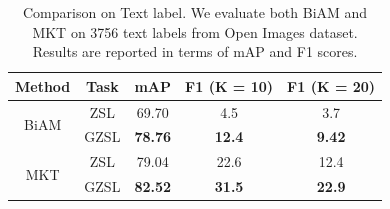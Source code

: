 \begin{table}[ht]
\centering
\footnotesize
\caption{Comparison on Text label. We evaluate both BiAM and MKT on 3756 text labels from Open Images dataset. Results are reported in terms of mAP and F1 scores. 
}
\begin{tabular}{cc|ccc} 
\toprule[0.15em]
\textbf{Method} & \textbf{Task} & \textbf{mAP} & \textbf{F1 (K = 10) } & \textbf{F1 (K = 20) } \\
\toprule[0.15em]
\multirow{2}{*}{BiAM} 
& ZSL & 69.70 & 4.5 & 3.7 \\
& GZSL & \textbf{78.76} & \textbf{12.4} & \textbf{9.42} \\
\hline
\multirow{2}{*}{MKT}
& ZSL & 79.04 & 22.6 & 12.4 \\
& GZSL & \textbf{82.52} & \textbf{31.5} & \textbf{22.9} \\
\bottomrule[0.1em]
\end{tabular}
\label{tab:text}
\end{table}